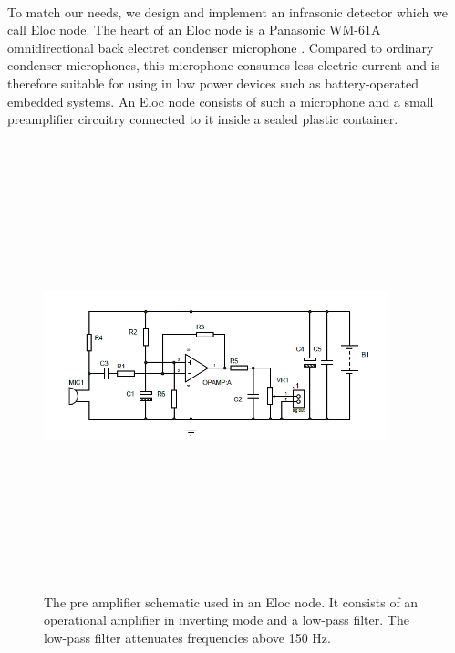 \documentclass[12pt]{article}
\numberwithin{figure}{section}
\numberwithin{table}{section}
\begin{document}
\paragraph{}
To match our needs, we design and implement an infrasonic detector which we call Eloc node. The heart of an Eloc node is a Panasonic WM-61A omnidirectional back electret condenser microphone \cite{15}. Compared to ordinary condenser microphones, this microphone consumes less electric current and is therefore suitable for using in low power devices such as battery-operated embedded systems. An Eloc node consists of such a microphone and a small preamplifier circuitry connected to it inside a sealed plastic container.

\begin{figure}[H]
\centering
\includegraphics[width=10cm,height=13cm,keepaspectratio]{circuit.png}
\caption{The pre amplifier schematic used in an Eloc node.
It consists of an operational amplifier in inverting mode and
a low-pass filter. The low-pass filter attenuates frequencies
above 150 Hz.}
\label{image:circuit}
\end{figure}
\end{document}
